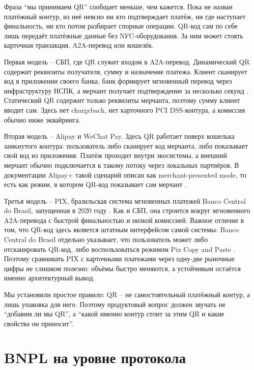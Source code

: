 Фраза \enquote{мы принимаем QR} сообщает меньше, чем кажется. Пока не
назван платёжный контур, из неё неясно ни кто подтверждает платёж,
ни где наступает финальность, ни кто потом разбирает спорные операции.
QR-код сам по себе лишь передаёт платёжные данные без NFC-оборудования.
За ним может стоять карточная транзакция, A2A-перевод или кошелёк.

Первая модель -- СБП, где QR служит входом в A2A-перевод. Динамический
QR содержит реквизиты получателя, сумму и назначение платежа. Клиент
сканирует код в приложении своего банка, банк формирует мгновенный
перевод через инфраструктуру НСПК, а мерчант получает подтверждение
за несколько секунд \cite{sbp-faq-business}. Статический QR содержит только
реквизиты мерчанта, поэтому сумму клиент вводит сам. Здесь нет
chargeback, нет карточного PCI DSS-контура, а комиссия обычно ниже
эквайринга.

Вторая модель -- Alipay и WeChat Pay. Здесь QR работает поверх
кошелька замкнутого контура: пользователь либо сканирует код
мерчанта, либо показывает свой код из приложения. Платёж проходит
внутри экосистемы, а внешний мерчант обычно подключается к такому
потоку через локальных партнёров. В документации Alipay+ такой сценарий
описан как merchant-presented mode, то есть как режим, в котором
QR-код показывает сам мерчант \cite{alipayplus-mpm}.

Третья модель -- PIX, бразильская система мгновенных платежей Banco
Central do Brasil, запущенная в 2020 году \cite{pix}. Как и СБП,
она строится вокруг мгновенного A2A-перевода с быстрой финальностью
и низкой комиссией. Важное отличие в том, что QR-код здесь является
штатным интерфейсом самой системы: Banco Central do Brasil отдельно
указывает, что пользователь может либо отсканировать QR-код, либо
воспользоваться режимом Pix Copy and Paste \cite{pix-faq}. Поэтому
сравнивать PIX с карточными платежами через одну-две рыночные цифры
не слишком полезно: объёмы быстро меняются, а устойчивым остаётся
именно архитектурный вывод.

Мы установили простое правило: QR -- не самостоятельный платёжный
контур, а лишь упаковка для него. Поэтому продуктовый вопрос должен
звучать не \enquote{добавим ли мы QR}, а \enquote{какой именно контур
стоит за этим QR и какие свойства он приносит}.

\section{BNPL на уровне протокола}
\label{sec:alt-bnpl}

